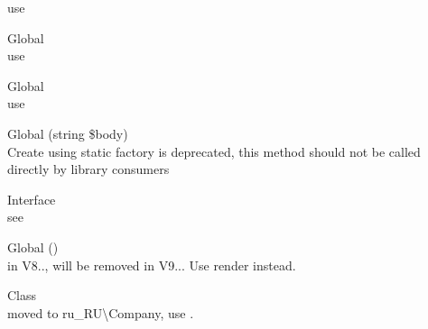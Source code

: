 \begin{DoxyRefList}
\label{deprecated__deprecated000244}%
%
use   
\item[Global \doxylink{class_nette_1_1_utils_1_1_image_ac56d430c2f558856a524f258ed89f156}{Image\+::SHRINK\+\_\+\+ONLY} ]\hfill \\
\label{deprecated__deprecated000238}%
%
use   
\item[Global \doxylink{class_nette_1_1_utils_1_1_image_ab6451b86381daa4c7ed5f8dab524bc3e}{Image\+::STRETCH} ]\hfill \\
\label{deprecated__deprecated000239}%
%
use   
\item[Global \doxylink{classphp_documentor_1_1_reflection_1_1_doc_block_1_1_tags_1_1_implements___a6fafdaff738bff5d477ed4a6b97253fe}{Implements\+\_\+\+::create} (string \$body)]\hfill \\
\label{deprecated__deprecated000275}%
%
Create using static factory is deprecated, this method should not be called directly by library consumers  
\item[Interface \doxylink{interface_illuminate_1_1_contracts_1_1_validation_1_1_implicit_rule}{Implicit\+Rule} ]\hfill \\
\label{deprecated__deprecated000101}%
%
see   
\item[Global \doxylink{class_sabberworm_1_1_c_s_s_1_1_property_1_1_import_a7516ca30af0db3cdbf9a7739b48ce91d}{Import\+::\+\_\+\+\_\+to\+String} ()]\hfill \\
\label{deprecated__deprecated000394}%
%
in V8.., will be removed in V9... Use {\ttfamily render} instead.  
\item[Class \doxylink{class_faker_1_1_calculator_1_1_inn}{Inn} ]\hfill \\
\label{deprecated__deprecated000052}%
%
moved to ru\+\_\+\+RU\textbackslash{}\+Company, use {\ttfamily {}}.  

\end{DoxyRefList}

